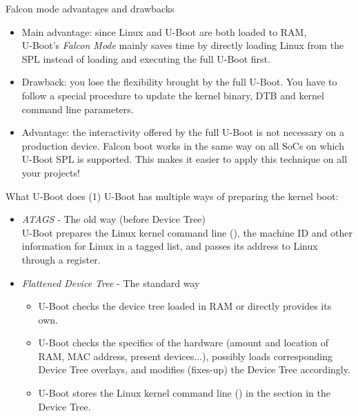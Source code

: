 \begin{frame}{Falcon mode advantages and drawbacks}
  \begin{itemize}
     \item Main advantage: since Linux and U-Boot are both loaded to RAM,\\
           U-Boot's {\em Falcon Mode} mainly saves time by directly loading Linux from the SPL
           instead of loading and executing the full U-Boot first.
     \item Drawback: you lose the flexibility brought by the full
           U-Boot. You have to follow a special procedure to update the kernel
           binary, DTB and kernel command line parameters.
     \item Advantage: the interactivity offered by the full U-Boot is
           not necessary on a production device. Falcon boot works in
           the same way on all SoCs on which U-Boot SPL is supported.
           This makes it easier to apply this technique on all your
           projects!
  \end{itemize}
\end{frame}

\begin{frame}{What U-Boot does (1)}
  U-Boot has multiple ways of preparing the kernel boot:
  \begin{itemize}
    \item {\em ATAGS} - The old way (before Device Tree)\\
          U-Boot prepares the Linux kernel command
          line (), the machine ID and other information for Linux in
          a tagged list, and passes its address to Linux through a
          register.
    \item {\em Flattened Device Tree} - The standard way
    \begin{itemize}
        \item U-Boot checks the device tree loaded in RAM
              or directly provides its own.
        \item U-Boot checks the specifics of the hardware
              (amount and location of RAM, MAC address, present
              devices...), possibly loads corresponding Device Tree overlays,
              and modifies (fixes-up) the Device Tree accordingly.
        \item U-Boot stores the Linux kernel command line
              () in the  section
              in the Device Tree.
    \end{itemize}
  \end{itemize}
\end{frame}

